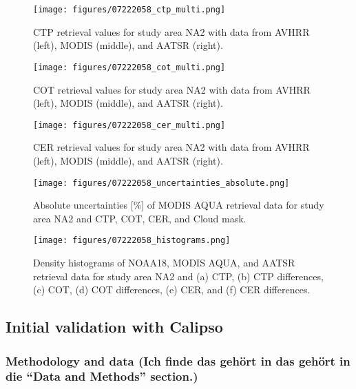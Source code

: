 \begin{figure*}[h]
  \texttt{[image: figures/07222058\_ctp\_multi.png]}
  \caption{CTP retrieval values for study area NA2 with data from AVHRR (left), MODIS (middle), and AATSR (right).}
  \label{fig:CTP_intercomparison}

  \texttt{[image: figures/07222058\_cot\_multi.png]}
  \caption{COT retrieval values for study area NA2 with data from AVHRR (left), MODIS (middle), and AATSR (right).}
  \label{fig:COT_intercomparison}

  \texttt{[image: figures/07222058\_cer\_multi.png]}
  \caption{CER retrieval values for study area NA2 with data from AVHRR (left), MODIS (middle), and AATSR (right).}
  \label{fig:CER_intercomparison}
\end{figure*}

\begin{figure*}[h]
  \texttt{[image: figures/07222058\_uncertainties\_absolute.png]} %
  \caption{Absolute uncertainties [\%] of MODIS AQUA retrieval data for study area NA2 and CTP, COT, CER, and Cloud mask.} %
  \label{fig:uncertainties}
\end{figure*}

\begin{figure*}[h]
  \texttt{[image: figures/07222058\_histograms.png]}
  \caption{Density histograms of NOAA18, MODIS AQUA, and AATSR retrieval data for study area NA2 and (a) CTP, (b) CTP differences, (c) COT, (d) COT differences, (e) CER, and (f) CER differences.}
  \label{fig:histograms}
\end{figure*}

\subsection{Initial validation with Calipso}

\subsubsection{Methodology and data (Ich finde das gehört in das gehört in die ``Data and Methods'' section.)}\label{sec:calipso_method}

